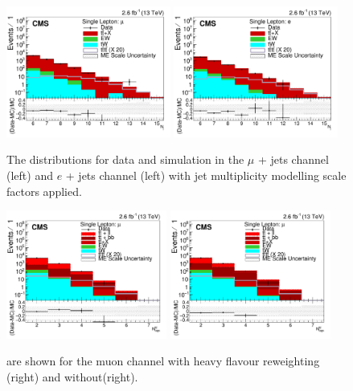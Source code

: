 \begin{figure}[]
    \includegraphics[width=0.48\textwidth]{images/Run2/nJets_StackLogY.pdf}
    \includegraphics[width=0.48\textwidth]{images/Run2/nJets_StackLogY_e.pdf}
    \caption{The \njets distributions for data and simulation in the $\mu$ + jets channel (left) and $e$ + jets channel (left) with jet multiplicity modelling scale factors applied.}
    \label{fig:withAlpha}
\end{figure}
\begin{figure}[]
    \includegraphics[width=0.47\textwidth]{images/Run2/nMtags_StackLogY_HF_wo_reweight.pdf} 
    \includegraphics[width=0.47\textwidth]{images/Run2/nMtags_StackLogY_HF_w_reweight.pdf} 
    \caption{\nMtags are shown for the muon channel with heavy flavour reweighting (right) and without(right).}
    \label{fig:HF_reweight}
\end{figure}

